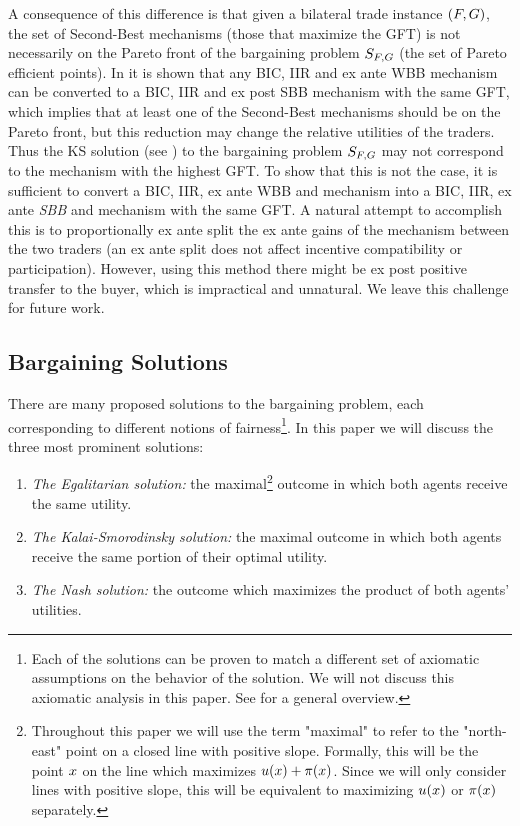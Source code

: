 {A consequence of this difference is that given a bilateral trade instance $(F,G)$, the set of Second-Best mechanisms (those that maximize the GFT) is not necessarily on the Pareto front of the bargaining problem $S_{F,G}$ (the set of Pareto efficient points). In \cite{BCWZ-17} it is shown that any BIC, IIR and ex ante WBB mechanism can be converted to a BIC, IIR and ex post SBB mechanism with the same GFT, which implies that at least one of the Second-Best mechanisms should be on the Pareto front, but this reduction may change the relative utilities of the traders. Thus the KS solution (see ) to the bargaining problem $S_{F,G}$ may not correspond to the {\ksfair} mechanism with the highest GFT. To show that this is not the case, it is sufficient to convert a BIC, IIR, ex ante WBB and {\ksfair} mechanism into a BIC, IIR, ex ante \emph{SBB} and {\ksfair} mechanism with the same GFT. A natural attempt to accomplish this is to proportionally ex ante split the ex ante gains of the mechanism between the two traders (an ex ante split does not affect incentive compatibility or participation). However, using this method there might be ex post positive transfer to the buyer, which is impractical and unnatural. We leave this challenge for future work. 



\subsection{Bargaining Solutions}

There are many proposed solutions to the bargaining problem, each corresponding to different notions of fairness\footnote{{Each of the solutions can be proven to match a different set of axiomatic assumptions on the behavior of the solution. We will not discuss this axiomatic analysis in this paper. See \cite{T-94} for a general overview.}}. In this paper we will discuss the three most prominent solutions:
\begin{enumerate}
    \item \emph{The Egalitarian solution:} the maximal\footnote{{Throughout this paper we will use the term "maximal" to refer to the "north-east" point on a closed line with positive slope. Formally, this will be the point $x$ on the line which maximizes $u(x) + \pi(x)$. Since we will only consider lines with positive slope, this will be equivalent to maximizing $u(x)$ or $\pi(x)$ separately.}} outcome in which both agents receive the same utility.
    \item \emph{The Kalai-Smorodinsky solution:} the maximal outcome in which both agents receive the same portion of their optimal utility.
    \item \emph{The Nash solution:} the outcome which maximizes the product of both agents' utilities.
\end{enumerate}

}
